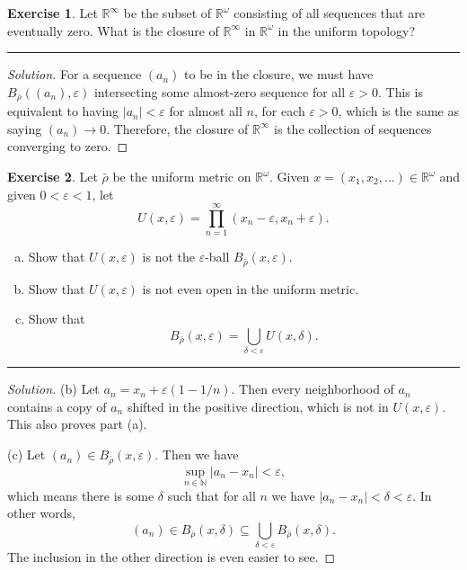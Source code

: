 \documentclass{article}
\theoremstyle{definition}
\newtheorem{exercise}{Exercise}[section]
\begin{document}
\pagebreak

\begin{exercise}
  Let $\mathbb{R}^\infty$ be the subset of $\mathbb{R}^\omega$ consisting of all sequences that are eventually zero. What is the closure of $\mathbb{R}^\infty$ in $\mathbb{R}^\omega$ in the uniform topology?
\end{exercise}\hrule
\begin{proof}[Solution]
  For a sequence $(a_n)$ to be in the closure, we must have $B_{\bar{\rho}}((a_n), \varepsilon)$ intersecting some almost-zero sequence for all $\varepsilon > 0$. This is equivalent to having $|a_n| < \varepsilon$ for almost all $n$, for each $\varepsilon > 0$, which is the same as saying $(a_n)\to 0$. Therefore, the closure of $\mathbb{R}^{\infty}$ is the collection of sequences converging to zero.
\end{proof}

\pagebreak

\begin{exercise}
  Let $\bar{\rho}$ be the uniform metric on $\mathbb{R}^\omega$. Given $x = (x_1,x_2,\dots)\in \mathbb{R}^\omega$ and given $0 < \varepsilon < 1$, let
  $$U(x,\varepsilon) = \prod_{n=1}^\infty (x_n-\varepsilon, x_n+\varepsilon).$$
  \begin{enumerate}[(a)]
    \item Show that $U(x,\varepsilon)$ is not the $\varepsilon$-ball $B_{\bar{\rho}}(x,\varepsilon)$.
    \item Show that $U(x,\varepsilon)$ is not even open in the uniform metric.
    \item Show that
    $$B_{\bar{\rho}}(x,\varepsilon) = \bigcup_{\delta < \varepsilon} U(x,\delta).$$
  \end{enumerate}
\end{exercise}\hrule
\begin{proof}[Solution]
  (b) Let $a_n = x_n + \varepsilon(1-1/n)$. Then every neighborhood of $a_n$ contains a copy of $a_n$ shifted in the positive direction, which is not in $U(x,\varepsilon)$. This also proves part (a).

  (c) Let $(a_n)\in B_{\bar{\rho}}(x,\varepsilon)$. Then we have
  $$\sup_{n\in\mathbb{N}} |a_n - x_n| < \varepsilon,$$
  which means there is some $\delta$ such that for all $n$ we have $|a_n - x_n| < \delta < \varepsilon$. In other words, 
  $$(a_n) \in B_{\bar{\rho}}(x,\delta)\subseteq \bigcup_{\delta < \varepsilon} B_{\bar{\rho}}(x,\delta).$$
  The inclusion in the other direction is even easier to see.
\end{proof}
\end{document}

